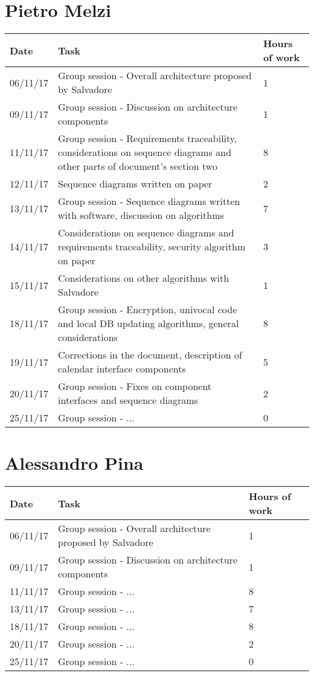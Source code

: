 \section{Pietro Melzi}
\begin{table}[H]
	\begin{tabular}{ p{2cm} p{10cm} p{3cm}}
	Date & Task & Hours of work\\
	\hline
	06/11/17 & Group session - Overall architecture proposed by Salvadore & 1 \\
	09/11/17 & Group session - Discussion on architecture components & 1 \\
	11/11/17 & Group session - Requirements traceability, considerations on sequence diagrams and other parts of document's section two & 8 \\
	12/11/17 & Sequence diagrams written on paper & 2 \\
	13/11/17 & Group session - Sequence diagrams written with software, discussion on algorithms & 7 \\
	14/11/17 & Considerations on sequence diagrams and requirements traceability, security algorithm on paper & 3 \\
	15/11/17 & Considerations on other algorithms with Salvadore & 1 \\
	18/11/17 & Group session - Encryption, univocal code and local DB updating algorithms, general considerations & 8 \\
	19/11/17 & Corrections in the document, description of calendar interface components & 5 \\
	20/11/17 & Group session - Fixes on component interfaces and sequence diagrams & 2 \\
	25/11/17 & Group session - ... & 0 \\
	\end{tabular}
\end{table}

\section{Alessandro Pina}
\begin{table}[H]
	\begin{tabular}{ p{2cm} p{10cm} p{3cm}}
	Date & Task & Hours of work\\
	\hline
	06/11/17 & Group session - Overall architecture proposed by Salvadore & 1 \\
	09/11/17 & Group session - Discussion on architecture components & 1 \\
	11/11/17 & Group session - ... & 8 \\
	13/11/17 & Group session - ... & 7 \\
	18/11/17 & Group session - ... & 8 \\
	20/11/17 & Group session - ... & 2 \\
	25/11/17 & Group session - ... & 0 \\
	\end{tabular}
\end{table}

